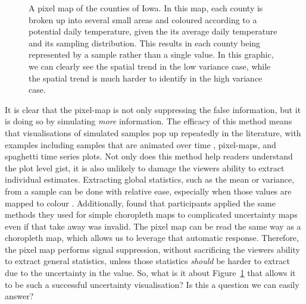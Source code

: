 \documentclass[
  12pt]{article}
\begin{document}
\begin{figure}
\begin{minipage}{0.33\linewidth}
\end{minipage}%
%
\begin{minipage}{0.33\linewidth}



\end{minipage}%

\caption{\label{fig-pixel}A pixel map of the counties of Iowa. In this
map, each county is broken up into several small areas and coloured
according to a potential daily temperature, given the its average daily
temperature and its sampling distribution. This results in each county
being represented by a sample rather than a single value. In this
graphic, we can clearly see the spatial trend in the low variance case,
while the spatial trend is much harder to identify in the high variance
case.}

\end{figure}%

It is clear that the pixel-map is not only suppressing the false
information, but it is doing so by simulating \emph{more} information.
The efficacy of this method means that visualisations of simulated
samples pop up repeatedly in the literature, with examples including
samples that are animated over time \citep{Hullman2015, Blenkinsop2000},
pixel-maps, and spaghetti time series plots. Not only does this method
help readers understand the plot level gist, it is also unlikely to
damage the viewers ability to extract individual estimates. Extracting
global statistics, such as the mean or variance, from a sample can be
done with relative ease, especially when those values are mapped to
colour \citep{Franconeri2021}. Additionally, \citet{Ndlovu2023} found
that participants applied the same methods they used for simple
choropleth maps to complicated uncertainty maps even if that take away
was invalid. The pixel map can be read the same way as a choropleth map,
which allows us to leverage that automatic response. Therefore, the
pixel map performs signal suppression, without sacrificing the viewers
ability to extract general statistics, unless those statistics
\emph{should} be harder to extract due to the uncertainty in the value.
So, what is it about Figure~\ref{fig-pixel} that allows it to be such a
successful uncertainty visualisation? Is this a question we can easily
answer?
\end{document}
